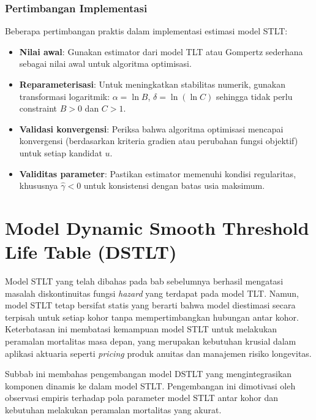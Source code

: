 \subsubsection{Pertimbangan Implementasi}

Beberapa pertimbangan praktis dalam implementasi estimasi model STLT:

\begin{itemize}
    \item \textbf{Nilai awal}: Gunakan estimator dari model TLT atau Gompertz sederhana sebagai nilai awal untuk algoritma optimisasi.
    
    \item \textbf{Reparameterisasi}: Untuk meningkatkan stabilitas numerik, gunakan transformasi logaritmik: $\alpha = \ln B$, $\delta = \ln(\ln C)$ sehingga tidak perlu constraint $B > 0$ dan $C > 1$.
    
    \item \textbf{Validasi konvergensi}: Periksa bahwa algoritma optimisasi mencapai konvergensi (berdasarkan kriteria gradien atau perubahan fungsi objektif) untuk setiap kandidat $u$.
    
    \item \textbf{Validitas parameter}: Pastikan estimator memenuhi kondisi regularitas, khususnya $\hat{\gamma} < 0$ untuk konsistensi dengan batas usia maksimum.
\end{itemize}

\section{Model Dynamic Smooth Threshold Life Table (DSTLT)}

Model STLT yang telah dibahas pada bab sebelumnya berhasil mengatasi masalah diskontinuitas fungsi \textit{hazard} yang terdapat pada model TLT. Namun, model STLT tetap bersifat statis yang berarti bahwa model  diestimasi secara terpisah untuk setiap kohor tanpa mempertimbangkan hubungan antar kohor. Keterbatasan ini membatasi kemampuan model STLT untuk melakukan peramalan mortalitas masa depan, yang merupakan kebutuhan krusial dalam aplikasi aktuaria seperti \textit{pricing} produk anuitas dan manajemen risiko longevitas.

Subbab ini membahas pengembangan model DSTLT yang mengintegrasikan komponen dinamis ke dalam model STLT. Pengembangan ini dimotivasi oleh observasi empiris terhadap pola parameter model STLT antar kohor dan kebutuhan melakukan peramalan mortalitas yang akurat.

